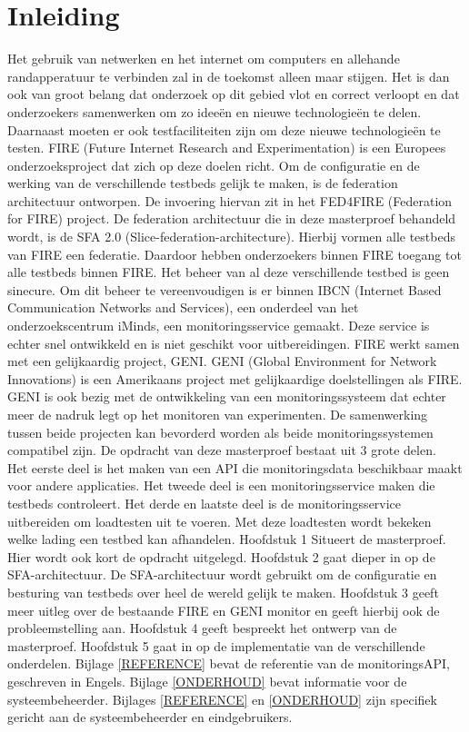 \chapter{Inleiding}
\npar
Het gebruik van netwerken en het internet om computers en allehande randapperatuur te verbinden zal in de toekomst alleen maar stijgen. Het is dan ook van groot belang dat onderzoek op dit gebied vlot en correct verloopt en dat onderzoekers samenwerken om zo idee\"en en nieuwe technologie\"en te delen. Daarnaast moeten er ook testfaciliteiten zijn om deze nieuwe technologie\"en te testen.
FIRE (Future Internet Research and Experimentation) is een Europees onderzoeksproject dat zich op deze doelen richt.
\npar
Om de configuratie en de werking van de verschillende testbeds gelijk te maken, is de federation architectuur ontworpen. De invoering hiervan zit in het FED4FIRE (Federation for FIRE) project. De federation architectuur die in deze masterproef behandeld wordt, is de SFA 2.0 (Slice-federation-architecture). Hierbij vormen alle testbeds van FIRE een federatie. Daardoor hebben onderzoekers binnen FIRE toegang tot alle testbeds binnen FIRE.
\npar
Het beheer van al deze verschillende testbed is geen sinecure. Om dit beheer te vereenvoudigen is er binnen IBCN (Internet Based Communication Networks and Services), een onderdeel van het onderzoekscentrum iMinds, een monitoringsservice gemaakt. 
Deze service is echter snel ontwikkeld en is niet geschikt voor uitbereidingen. 
\npar
FIRE werkt samen met een gelijkaardig project, GENI. GENI (Global Environment for Network Innovations) is een Amerikaans project met gelijkaardige doelstellingen als FIRE. GENI is ook bezig met de ontwikkeling van een monitoringssysteem dat echter meer de nadruk legt op het monitoren van experimenten. De samenwerking tussen beide projecten kan bevorderd worden als beide monitoringssystemen compatibel zijn.
\npar
De opdracht van deze masterproef bestaat uit 3 grote delen. \\
Het eerste deel is het maken van een API die monitoringsdata beschikbaar maakt voor andere applicaties. Het tweede deel is een monitoringsservice maken die testbeds controleert. Het derde en laatste deel is de monitoringsservice uitbereiden om loadtesten uit te voeren. Met deze loadtesten wordt bekeken welke lading een testbed kan afhandelen.
\clearpage
\npar
Hoofdstuk 1 Situeert de masterproef. Hier wordt ook kort de opdracht uitgelegd.
\npar
Hoofdstuk 2 gaat dieper in op de SFA-architectuur. De SFA-architectuur wordt gebruikt om de configuratie en besturing van testbeds over heel de wereld gelijk te maken.
\npar
Hoofdstuk 3 geeft meer uitleg over de bestaande FIRE en GENI monitor en geeft hierbij ook de probleemstelling aan.
\npar
Hoofdstuk 4 geeft bespreekt het ontwerp van de masterproef.
\npar
Hoofdstuk 5 gaat in op de implementatie van de verschillende onderdelen.
\npar
Bijlage \ref{REFERENCE} bevat de referentie van de monitoringsAPI, geschreven in Engels.
\npar
Bijlage \ref{ONDERHOUD}  bevat informatie voor de systeembeheerder.
\npar 
Bijlages \ref{REFERENCE} en \ref{ONDERHOUD} zijn specifiek gericht aan de systeembeheerder en eindgebruikers.